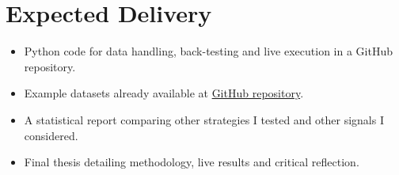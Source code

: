 \documentclass[12pt,a4paper]{article}
\begin{document}
\section{Expected Delivery}
\begin{itemize}
  \item Python code for data handling, back-testing and live execution in a GitHub repository.
  \item Example datasets already available at
        \href{https://github.com/AJslashTracey/OBDeltaData}{GitHub repository}.
  \item A statistical report comparing other strategies I tested and other signals I considered.
  \item Final thesis detailing methodology, live results and critical reflection.
\end{itemize}
\end{document}
